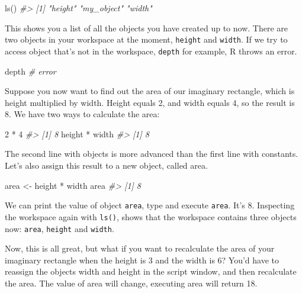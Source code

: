 \documentclass[
]{book}
\newenvironment{Shaded}{\begin{snugshade}}{\end{snugshade}}
\newcommand{\CommentTok}[1]{\textcolor[rgb]{0.56,0.35,0.01}{\textit{#1}}}
\newcommand{\DecValTok}[1]{\textcolor[rgb]{0.00,0.00,0.81}{#1}}
\newcommand{\FunctionTok}[1]{\textcolor[rgb]{0.00,0.00,0.00}{#1}}
\newcommand{\NormalTok}[1]{#1}
\newcommand{\OtherTok}[1]{\textcolor[rgb]{0.56,0.35,0.01}{#1}}
\newcommand{\SpecialCharTok}[1]{\textcolor[rgb]{0.00,0.00,0.00}{#1}}
\begin{document}
\begin{Shaded}
\begin{Highlighting}[]
\FunctionTok{ls}\NormalTok{()}
\CommentTok{\#\textgreater{} [1] "height"    "my\_object" "width"}
\end{Highlighting}
\end{Shaded}

This shows you a list of all the objects you have created up to now. There are two objects in your workspace at the moment, \texttt{height} and \texttt{width}. If we try to access object that's not in the workspace, \texttt{depth} for example, R throws an error.

\begin{Shaded}
\begin{Highlighting}[]
\NormalTok{depth  }\CommentTok{\# error}
\end{Highlighting}
\end{Shaded}

Suppose you now want to find out the area of our imaginary rectangle, which is height multiplied by width. Height equals 2, and width equals 4, so the result is 8. We have two ways to calculate the area:

\begin{Shaded}
\begin{Highlighting}[]
\DecValTok{2} \SpecialCharTok{*} \DecValTok{4}
\CommentTok{\#\textgreater{} [1] 8}
\NormalTok{height }\SpecialCharTok{*}\NormalTok{ width}
\CommentTok{\#\textgreater{} [1] 8}
\end{Highlighting}
\end{Shaded}

The second line with objects is more advanced than the first line with constants. Let's also assign this result to a new object, called area.

\begin{Shaded}
\begin{Highlighting}[]
\NormalTok{area }\OtherTok{\textless{}{-}}\NormalTok{ height }\SpecialCharTok{*}\NormalTok{ width}
\NormalTok{area }
\CommentTok{\#\textgreater{} [1] 8}
\end{Highlighting}
\end{Shaded}

We can print the value of object \texttt{area}, type and execute \texttt{area}. It's 8. Inspecting the workspace again with \texttt{ls()}, shows that the workspace contains three objects now: \texttt{area}, \texttt{height} and \texttt{width}.

Now, this is all great, but what if you want to recalculate the area of your imaginary rectangle when the height is 3 and the width is 6? You'd have to reassign the objects width and height in the script window, and then recalculate the area. The value of area will change, executing area will return 18.
\end{document}
